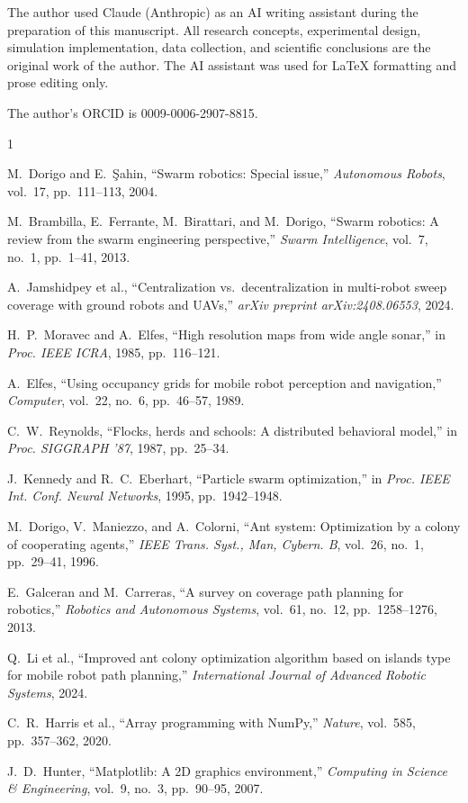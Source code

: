 \documentclass[journal,compsoc]{IEEEtran}
\begin{document}
The author used Claude (Anthropic) as an AI writing assistant during the preparation
of this manuscript. All research concepts, experimental design, simulation implementation,
data collection, and scientific conclusions are the original work of the author. The AI
assistant was used for LaTeX formatting and prose editing only.

The author's ORCID is 0009-0006-2907-8815.

\begin{thebibliography}{1}

M.~Dorigo and E.~\c{S}ahin, ``Swarm robotics: Special issue,''
\emph{Autonomous Robots}, vol.~17, pp.~111--113, 2004.

M.~Brambilla, E.~Ferrante, M.~Birattari, and M.~Dorigo,
``Swarm robotics: A review from the swarm engineering perspective,''
\emph{Swarm Intelligence}, vol.~7, no.~1, pp.~1--41, 2013.

A.~Jamshidpey et al., ``Centralization vs.\ decentralization in multi-robot
sweep coverage with ground robots and {UAV}s,''
\emph{arXiv preprint arXiv:2408.06553}, 2024.

H.~P.~Moravec and A.~Elfes, ``High resolution maps from wide angle sonar,''
in \emph{Proc. IEEE ICRA}, 1985, pp.~116--121.

A.~Elfes, ``Using occupancy grids for mobile robot perception and navigation,''
\emph{Computer}, vol.~22, no.~6, pp.~46--57, 1989.

C.~W.~Reynolds, ``Flocks, herds and schools: A distributed behavioral model,''
in \emph{Proc. SIGGRAPH '87}, 1987, pp.~25--34.

J.~Kennedy and R.~C.~Eberhart, ``Particle swarm optimization,''
in \emph{Proc. IEEE Int. Conf. Neural Networks}, 1995, pp.~1942--1948.

M.~Dorigo, V.~Maniezzo, and A.~Colorni, ``Ant system: Optimization by a colony
of cooperating agents,''
\emph{IEEE Trans. Syst., Man, Cybern. B}, vol.~26, no.~1, pp.~29--41, 1996.

E.~Galceran and M.~Carreras, ``A survey on coverage path planning for robotics,''
\emph{Robotics and Autonomous Systems}, vol.~61, no.~12, pp.~1258--1276, 2013.

Q.~Li et al., ``Improved ant colony optimization algorithm based on islands type
for mobile robot path planning,''
\emph{International Journal of Advanced Robotic Systems}, 2024.

C.~R.~Harris et al., ``Array programming with {NumPy},''
\emph{Nature}, vol.~585, pp.~357--362, 2020.

J.~D.~Hunter, ``Matplotlib: A 2{D} graphics environment,''
\emph{Computing in Science \& Engineering}, vol.~9, no.~3, pp.~90--95, 2007.

\end{thebibliography}
\end{document}
